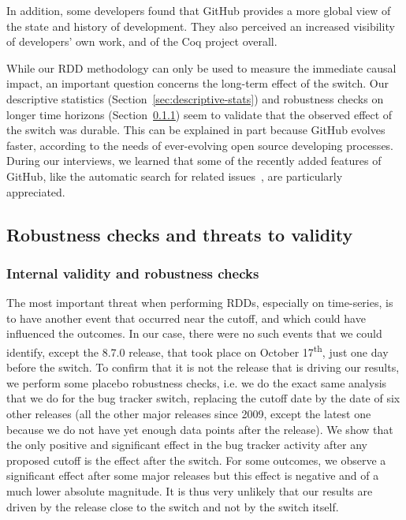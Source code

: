 In addition, some developers found that GitHub provides a more global view of the state and history of development. They also perceived an increased visibility of developers' own work, and of the Coq project overall.  

While our RDD methodology can only be used to measure the immediate causal impact, an important question concerns the long-term effect of the switch.
Our descriptive statistics (Section~\ref{sec:descriptive-stats}) and robustness checks on longer time horizons (Section~\ref{sec:robustness-checks}) seem to validate that the observed effect of the switch was durable.
This can be explained in part because GitHub evolves faster, according to the needs of ever-evolving open source developing processes.
During our interviews, we learned that some of the recently added features of GitHub, like the automatic search for related issues~\cite{github_related_issues}, are particularly appreciated.

\subsection{Robustness checks and threats to validity}

\subsubsection{Internal validity and robustness checks}

\label{sec:robustness-checks}

The most important threat when performing RDDs, especially on time-series, is to have another event that occurred near the cutoff, and which could have influenced the outcomes. In our case, there were no such events that we could identify, except the 8.7.0 release, that took place on October 17\textsuperscript{th}, just one day before the switch.
To confirm that it is not the release that is driving our results, we perform some placebo robustness checks, i.e. we do the exact same analysis that we do for the bug tracker switch, replacing the cutoff date by the date of six other releases (all the other major releases since 2009, except the latest one because we do not have yet enough data points after the release). We show that the only positive and significant effect in the bug tracker activity after any proposed cutoff is the effect after the switch. For some outcomes, we observe a significant effect after some major releases but this effect is negative and of a much lower absolute magnitude. It is thus very unlikely that our results are driven by the release close to the switch and not by the switch itself.  

